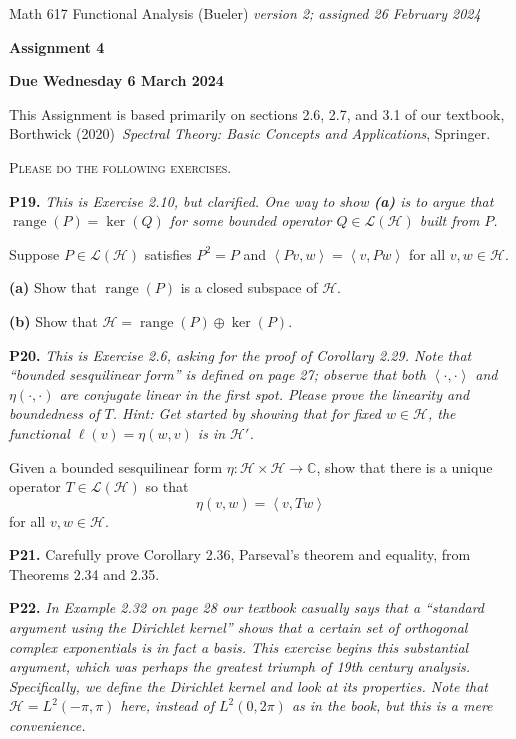 \documentclass[12pt]{amsart}
\newcommand{\cH}{\mathcal{H}}
\newcommand{\cL}{\mathcal{L}}
\newcommand{\CC}{\mathbb{C}}
\newcommand{\ip}[2]{\ensuremath{\left<#1,#2\right>}}
\newcommand{\range}{\operatorname{range}}
\newcommand{\prob}[1]{\bigskip\noindent\textbf{#1.}\quad }
\newcommand{\epart}[1]{\medskip\noindent\textbf{(#1)}\quad }
\begin{document}
\scriptsize \noindent Math 617 Functional Analysis (Bueler) \hfill \emph{version 2; assigned 26 February 2024}
\normalsize\medskip

\Large\centerline{\textbf{Assignment 4}}
\large
\medskip

\centerline{\textbf{Due Wednesday 6 March 2024}}
\medskip
\normalsize

\thispagestyle{empty}

\bigskip
\noindent This Assignment is based primarily on sections 2.6, 2.7, and 3.1 of our textbook, Borthwick (2020)~\emph{Spectral Theory: Basic Concepts and Applications}, Springer.

\medskip
\noindent \textsc{Please do the following exercises.}
\smallskip


\prob{P19}  \emph{This is Exercise 2.10, but clarified.  One way to show \emph{\textbf{(a)}} is to argue that $\range(P)=\ker(Q)$ for some bounded operator $Q\in\cL(\cH)$ built from $P$.}

\medskip\noindent Suppose $P\in\cL(\cH)$ satisfies $P^2=P$ and $\ip{Pv}{w} = \ip{v}{Pw}$ for all $v,w\in\cH$.

\epart{a}  Show that $\range(P)$ is a closed subspace of $\cH$.

\epart{b}  Show that $\cH = \range(P) \oplus \ker(P)$.

\prob{P20}  \emph{This is Exercise 2.6, asking for the proof of Corollary 2.29.  Note that ``bounded sesquilinear form'' is defined on page 27; observe that both $\ip{\cdot}{\cdot}$ and $\eta(\cdot,\cdot)$ are conjugate linear in the first spot.  Please prove the linearity and boundedness of $T$.  Hint: Get started by showing that for fixed $w\in\cH$, the functional $\ell(v) = \eta(w,v)$ is in $\cH'$.}

\medskip\noindent Given a bounded sesquilinear form $\eta:\cH\times \cH \to \CC$, show that there is a unique operator $T\in \cL(\cH)$ so that
	$$\eta(v,w) = \ip{v}{Tw}$$
for all $v,w\in\cH$.


\prob{P21}  Carefully prove Corollary 2.36, Parseval's theorem and equality, from Theorems 2.34 and 2.35.


\prob{P22}  \emph{In Example 2.32 on page 28 our textbook casually says that a ``standard argument using the Dirichlet kernel'' shows that a certain set of orthogonal complex exponentials is in fact a basis.  This exercise begins this substantial argument, which was perhaps the greatest triumph of 19th century analysis.  Specifically, we define the Dirichlet kernel and look at its properties.  Note that $\cH=L^2(-\pi,\pi)$ here, instead of $L^2(0,2\pi)$ as in the book, but this is a mere convenience.}
\end{document}
